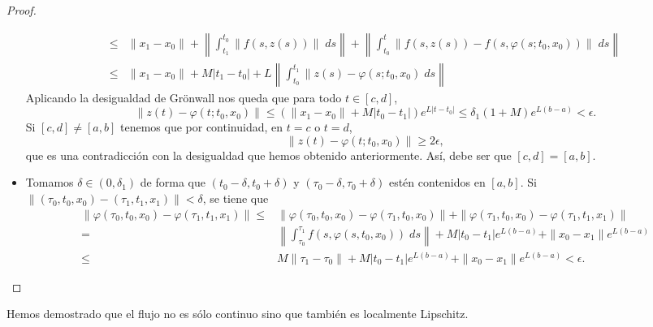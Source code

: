 \begin{proof}
\begin{itemize}
\[\begin{split}
	\leq & \|x_{1}-x_{0}\| + \left\|\int^{t_{0}}_{t_{1}} \|f\left(s, z\left(s\right)\right)\| \; d s\right\| + \left\|\int^{t}_{t_{0}} \|f\left(s, z\left(s\right)\right)-f\left(s, \varphi\left(s; t_{0}, x_{0}\right)\right)\| \; d s\right\|\\
	\leq & \|x_{1}-x_{0}\| + M \left|t_{1}-t_{0}\right| + L\left\|\int^{t_{1}}_{t_{0}} \|z\left(s\right)-\varphi\left(s; t_{0}, x_{0}\right) \; d s\right\|
\end{split}
\]
Aplicando la desigualdad de Grönwall nos queda que para todo $\displaystyle t \in \left[c,d\right]  $,
\[\|z\left(t\right)-\varphi\left(t; t_{0}, x_{0}\right)\| \leq \left(\|x_{1} -x_{0}\| + M \left|t_{0}-t_{1}\right|\right)e^{L \left|t-t_{0}\right|} \leq \delta_{1}\left(1+M\right)e^{L\left(b-a\right)}<\epsilon   .\]
Si $\displaystyle \left[c,d\right] \neq \left[a,b\right]  $ tenemos que por continuidad, en $\displaystyle t = c $ o $\displaystyle t = d $, 
\[ \|z\left(t\right)-\varphi\left(t; t_{0}, x_{0}\right)\|\geq 2\epsilon  ,\]
que es una contradicción con la desigualdad que hemos obtenido anteriormente. Así, debe ser que $\displaystyle \left[c,d\right] =\left[a,b\right]  $. 
\item Tomamos $\displaystyle \delta \in \left(0, \delta _{1}\right) $ de forma que $\displaystyle \left(t_{0}-\delta, t_{0} + \delta \right) $ y $\displaystyle \left(\tau_{0}-\delta, \tau_{0} + \delta \right) $ estén contenidos en $\displaystyle \left[a,b\right]  $.
	Si $\displaystyle \|\left(\tau_{0}, t_{0}, x_{0}\right)-\left(\tau_{1}, t_{1}, x_{1}\right)\| < \delta  $, se tiene que 
	\[
	\begin{split}
		\|\varphi\left(\tau_{0}, t_{0}, x_{0}\right)-\varphi\left(\tau_{1}, t_{1}, x_{1}\right)\| \leq & \|\varphi\left(\tau_{0}, t_{0}, x_{0}\right)-\varphi\left(\tau_{1}, t_{0}, x_{0}\right)\| + \|\varphi\left(\tau_{1}, t_{0}, x_{0}\right)-\varphi\left(\tau_{1}, t_{1}, x_{1}\right)\| \\
		= & \left\|\int^{\tau_{1}}_{\tau_{0}} f\left(s, \varphi\left(s, t_{0}, x_{0}\right)\right) \; d s\right\| + M \left|t_{0}-t_{1}\right|e^{L \left(b-a\right)} + \|x_{0}-x_{1}\|e^{L\left(b-a\right)} \\
		\leq & M \|\tau_{1} -\tau_{0}\| + M \left|t_{0}-t_{1}\right|e^{L\left(b-a\right)} + \|x_{0}-x_{1}\|e^{L\left(b-a\right)} < \epsilon .
	\end{split}
	\]
\end{itemize}
\end{proof}

\begin{observation}
Hemos demostrado que el flujo no es sólo continuo sino que también es localmente Lipschitz. 
\end{observation}
